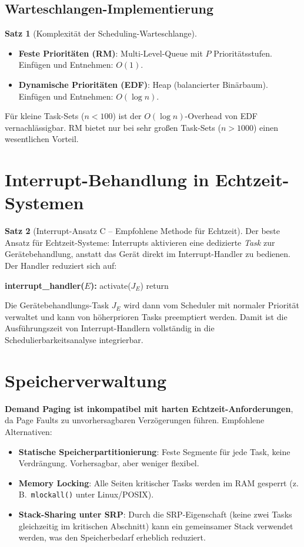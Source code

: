 ﻿\documentclass[a4paper,12pt]{report}
\theoremstyle{definition}
\newtheorem{satz}{Satz}[chapter]
\begin{document}
\subsection{Warteschlangen-Implementierung}

\begin{satz}[Komplexität der Scheduling-Warteschlange]
	\begin{itemize}
		\item \textbf{Feste Prioritäten (RM)}: Multi-Level-Queue mit $P$ Prioritätsstufen.
		      Einfügen und Entnehmen: $O(1)$.
		\item \textbf{Dynamische Prioritäten (EDF)}: Heap (balancierter Binärbaum).
		      Einfügen und Entnehmen: $O(\log n)$.
	\end{itemize}
	Für kleine Task-Sets ($n < 100$) ist der $O(\log n)$-Overhead von EDF
	vernachlässigbar. RM bietet nur bei sehr großen Task-Sets ($n > 1000$) einen
	wesentlichen Vorteil.
\end{satz}

\section{Interrupt-Behandlung in Echtzeit-Systemen}

\begin{satz}[Interrupt-Ansatz C -- Empfohlene Methode für Echtzeit]
	Der beste Ansatz für Echtzeit-Systeme: Interrupts aktivieren eine dedizierte
	\emph{Task} zur Gerätebehandlung, anstatt das Gerät direkt im Interrupt-Handler
	zu bedienen. Der Handler reduziert sich auf:
	\begin{algorithmic}[1]
		\State \textbf{interrupt\_handler($E$):}
		\State activate($J_E$) 
		\State return
	\end{algorithmic}
	Die Gerätebehandlungs-Task $J_E$ wird dann vom Scheduler mit normaler Priorität
	verwaltet und kann von höherprioren Tasks preemptiert werden. Damit ist die
	Ausführungszeit von Interrupt-Handlern vollständig in die Schedulierbarkeitsanalyse
	integrierbar.
\end{satz}

\section{Speicherverwaltung}

\textbf{Demand Paging ist inkompatibel mit harten Echtzeit-Anforderungen},
da Page Faults zu unvorhersagbaren Verzögerungen führen. Empfohlene Alternativen:
\begin{itemize}
	\item \textbf{Statische Speicherpartitionierung}: Feste Segmente für jede Task,
	      keine Verdrängung. Vorhersagbar, aber weniger flexibel.
	\item \textbf{Memory Locking}: Alle Seiten kritischer Tasks werden im RAM gesperrt
	      (z.\,B.\ \texttt{mlockall()} unter Linux/POSIX).
	\item \textbf{Stack-Sharing unter SRP}: Durch die SRP-Eigenschaft (keine zwei Tasks
	      gleichzeitig im kritischen Abschnitt) kann ein gemeinsamer Stack verwendet
	      werden, was den Speicherbedarf erheblich reduziert.
\end{itemize}
\end{document}
